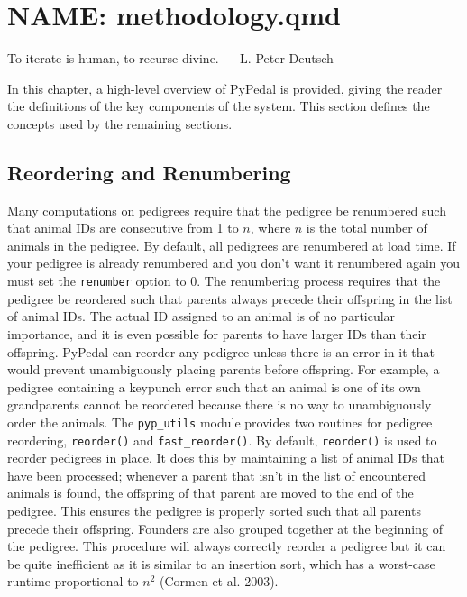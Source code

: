 \documentclass[
  letterpaper,
  DIV=11,
  numbers=noendperiod]{scrreprt}
\begin{document}

\chapter{NAME: methodology.qmd}\label{name-methodology.qmd}

\begin{tcolorbox}[enhanced jigsaw, colframe=quarto-callout-tip-color-frame, bottomrule=.15mm, toprule=.15mm, colback=white, left=2mm, breakable, rightrule=.15mm, leftrule=.75mm, opacityback=0, arc=.35mm]

To iterate is human, to recurse divine. --- L. Peter Deutsch

\end{tcolorbox}

In this chapter, a high-level overview of PyPedal is provided, giving
the reader the definitions of the key components of the system. This
section defines the concepts used by the remaining sections.

\section{Reordering and
Renumbering}\label{sec-methodology-reordering-and-renumbering}

Many computations on pedigrees require that the pedigree be renumbered
such that animal IDs are consecutive from 1 to \(n\), where \(n\) is the
total number of animals in the pedigree. By default, all pedigrees are
renumbered at load time. If your pedigree is already renumbered and you
don't want it renumbered again you must set the \texttt{renumber} option
to 0. The renumbering process requires that the pedigree be reordered
such that parents always precede their offspring in the list of animal
IDs. The actual ID assigned to an animal is of no particular importance,
and it is even possible for parents to have larger IDs than their
offspring. PyPedal can reorder any pedigree unless there is an error in
it that would prevent unambiguously placing parents before offspring.
For example, a pedigree containing a keypunch error such that an animal
is one of its own grandparents cannot be reordered because there is no
way to unambiguously order the animals. The \texttt{pyp\_utils} module
provides two routines for pedigree reordering, \texttt{reorder()} and
\texttt{fast\_reorder()}. By default, \texttt{reorder()} is used to
reorder pedigrees in place. It does this by maintaining a list of animal
IDs that have been processed; whenever a parent that isn't in the list
of encountered animals is found, the offspring of that parent are moved
to the end of the pedigree. This ensures the pedigree is properly sorted
such that all parents precede their offspring. Founders are also grouped
together at the beginning of the pedigree. This procedure will always
correctly reorder a pedigree but it can be quite inefficient as it is
similar to an insertion sort, which has a worst-case runtime
proportional to \(n^{2}\) (Cormen et al. 2003).
\end{document}
